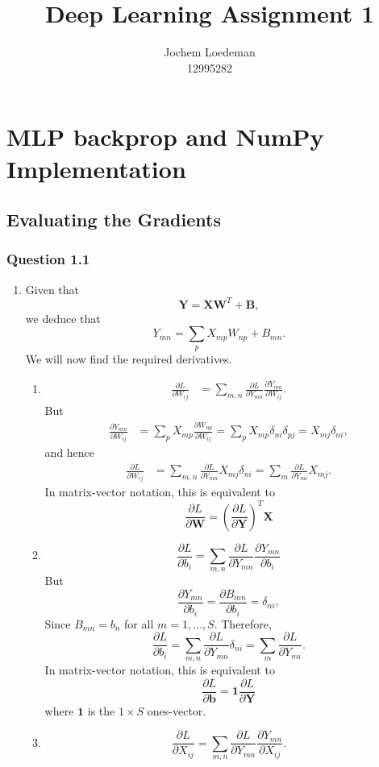 \documentclass{article}
\title{Deep Learning Assignment 1}
\author{%
  Jochem Loedeman \\
  12995282
}
\renewcommand{\b}[1]{\boldsymbol{#1}}
\newcommand{\pfrac}[2]{\frac{\partial #1}{\partial #2}}
\begin{document}
\maketitle


\section{MLP backprop and NumPy Implementation}
\subsection{Evaluating the Gradients}
\subsubsection*{Question 1.1}
\begin{enumerate}[label=(\alph*)]
	\item 
	Given that
	$$
	\b Y = \b X \b W^T + \b B,
	$$ we deduce that
	$$
	Y_{mn} = \sum_p X_{mp}W_{np} + B_{mn}.
	$$ We will now find the required derivatives.
	\begin{enumerate}[label=(\roman*)]
	\item 
	$$
	\begin{aligned}
	\pfrac{L}{W_{ij}} &= \sum_{m, n}\pfrac{L}{Y_{mn}}\pfrac{Y_{mn}}{W_{ij}}.
	\end{aligned}
	$$ But
	$$
	\begin{aligned}
	\pfrac{Y_{mn}}{W_{ij}} &= \sum_pX_{mp}\pfrac{W_{np}}{W_{ij}} = \sum_pX_{mp}\delta_{ni}\delta_{pj} = X_{mj}\delta_{ni},
	\end{aligned}
	$$ and hence
	$$
	\begin{aligned}
	\pfrac{L}{W_{ij}} &= \sum_{m, n}\pfrac{L}{Y_{mn}}X_{mj}\delta_{ni} = \sum_m \pfrac{L}{Y_{mi}}X_{mj}.
	\end{aligned}
	$$ In matrix-vector notation, this is equivalent to
	$$
	\pfrac{L}{\b W} = \left(\pfrac{L}{\b Y}\right)^T\b X
	$$
	\item
	$$
	\pfrac{L}{b_i} = \sum_{m, n}\pfrac{L}{Y_{mn}}\pfrac{Y_{mn}}{b_i}
	$$
	But
	$$
	\pfrac{Y_{mn}}{b_i} = \pfrac{B_{mn}}{b_i} = \delta_{ni},
	$$ Since $B_{mn} = b_n$ for all $m = 1,\dots, S$. Therefore,
	$$
	\pfrac{L}{b_i} = \sum_{m, n}\pfrac{L}{Y_{mn}}\delta_{ni} = \sum_{m}\pfrac{L}{Y_{mi}}.
	$$ In matrix-vector notation, this is equivalent to
	$$
	\pfrac{L}{\b b} = \b 1 \pfrac{L}{\b Y}
	$$ where $\b 1$ is the $1 \times S$ ones-vector.
	\item 
	$$
	\pfrac{L}{X_{ij}} = \sum_{m, n}\pfrac{L}{Y_{mn}}\pfrac{Y_{mn}}{X_{ij}}.
$$
\end{enumerate}
\end{enumerate}
\end{document}
